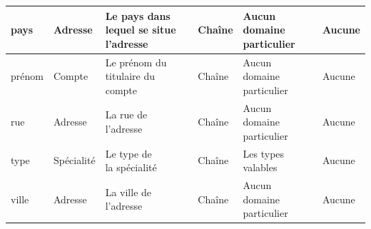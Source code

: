 \begin{center}
\begin{longtable}{|p{2cm}|p{2cm}|p{3cm}|p{2cm}|p{2cm}|p{2cm}|}
        \hline
        pays & Adresse & \parbox[t]{3cm}{Le pays dans\\lequel se situe\\l'adresse\\}  & Chaîne & \parbox[t]{2cm}{Aucun\\ domaine particulier\\}  
        & Aucune \\
        \hline
        prénom & Compte & \parbox[t]{3cm}{Le prénom du titulaire du compte\\} & Chaîne & \parbox[t]{2cm}{Aucun\\ domaine particulier\\}
        & Aucune \\
        \hline
        rue & Adresse & \parbox[t]{3cm}{La rue de\\ l'adresse\\} & Chaîne & \parbox[t]{2cm}{Aucun\\ domaine particulier\\} & Aucune \\
        \hline
        type & Spécialité & \parbox[t]{3cm}{Le type de\\ la spécialité\\} & Chaîne & \parbox[t]{2cm}{Les types\\ valables\\} & Aucune\\
        \hline
        ville & Adresse & \parbox[t]{3cm}{La ville de\\ l'adresse\\} & Chaîne & \parbox[t]{2cm}{Aucun\\ domaine particulier\\} & Aucune \\
        \hline
        
\end{longtable}
\end{center}


